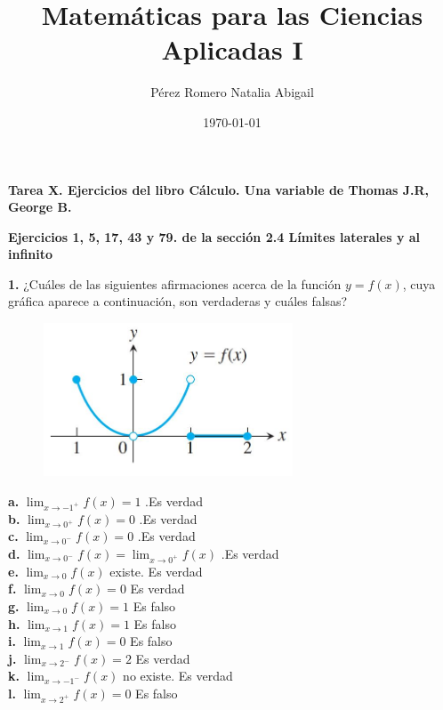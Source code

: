 \documentclass[12pt, letterpaper]{article}
\title{Matemáticas para las Ciencias Aplicadas I}
\author{Pérez Romero Natalia Abigail}
\date{\today}
\begin{document}
\maketitle
\textbf{Tarea X. Ejercicios del libro Cálculo. Una variable de Thomas J.R, George B.}

\textbf{Ejercicios 1, 5, 17, 43 y 79. de  la sección 2.4 Límites laterales y al infinito}

\textbf{1.} ¿Cuáles de las siguientes afirmaciones acerca de la función $y = f(x)$, cuya gráfica aparece a continuación, son verdaderas y cuáles falsas?\\


\begin{figure}[tbh]
\centering
\includegraphics[width=20em]{t11uno}
\end{figure}

\textbf{a.} $\lim_{ x \to -1^+} f(x) = 1$ .Es verdad\\
\textbf{b.} $\lim_{ x \to 0^+} f(x) = 0$ .Es verdad\\
\textbf{c.} $\lim_{ x \to 0^-} f(x) = 0$ .Es verdad\\
\textbf{d.} $\lim_{ x \to 0^-} f(x) =  \lim_{ x \to 0^+} f(x)$ .Es verdad\\
\textbf{e.} $\lim_{ x \to 0} f(x)$ existe. Es verdad\\
\textbf{f.} $\lim_{ x \to 0} f(x) = 0$ Es verdad\\
\textbf{g.} $\lim_{ x \to 0} f(x) = 1$ Es falso\\
\textbf{h.} $\lim_{ x \to 1} f(x) = 1$ Es falso\\
\textbf{i.} $\lim_{ x \to 1} f(x) = 0$ Es falso\\
\textbf{j.} $\lim_{ x \to 2^-} f(x) = 2$ Es verdad\\
\textbf{k.} $\lim_{ x \to -1^-} f(x) $ no existe. Es verdad\\
\textbf{l.} $\lim_{ x \to 2^+} f(x) = 0$ Es falso\\
\end{document}
